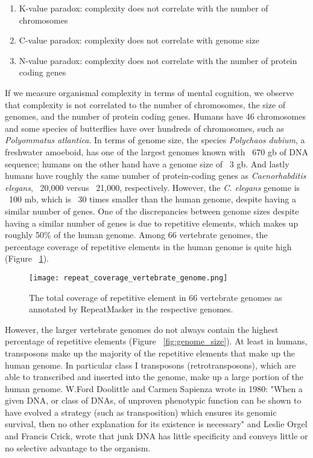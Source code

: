 \begin{enumerate}
   \item K-value paradox: complexity does not correlate with the number of chromosomes
   \item C-value paradox: complexity does not correlate with genome size
   \item N-value paradox: complexity does not correlate with the number of protein coding genes
\end{enumerate}

If we measure organismal complexity in terms of mental cognition, we observe that complexity is not correlated to the number of chromosomes, the size of genomes, and the number of protein coding genes. Humans have 46 chromosomes and some species of butterflies have over hundreds of chromosomes, such as \textit{Polyommatus atlantica}. In terms of genome size, the species \textit{Polychaos dubium}, a freshwater amoeboid, has one of the largest genomes known with ~670 gb of DNA sequence; humans on the other hand have a genome size of ~3 gb. And lastly humans have roughly the same number of protein-coding genes as \textit{Caenorhabditis elegans}, ~20,000 versus ~21,000, respectively. However, the \textit{C. elegans} genome is ~100 mb\cite{celegans1998sequencing}, which is ~30 times smaller than the human genome, despite having a similar number of genes. One of the discrepancies between genome sizes despite having a similar number of genes is due to repetitive elements, which makes up roughly 50\% of the human genome. Among 66 vertebrate genomes, the percentage coverage of repetitive elements in the human genome is quite high (Figure ~\ref{fig:repeat_coverage_vertebrate_genome}).

\begin{figure}[h]
   \centering
   \texttt{[image: repeat\_coverage\_vertebrate\_genome.png]}
   \caption[Coverage of repetitive elements in vertebrate genomes]{The total coverage of repetitive element in 66 vertebrate genomes as annotated by RepeatMasker in the respective genomes\cite{tang2014repcoverage}.}
   \label{fig:repeat_coverage_vertebrate_genome}
\end{figure}

However, the larger vertebrate genomes do not always contain the highest percentage of repetitive elements (Figure ~\ref{fig:genome_size}). At least in humans, transposons make up the majority of the repetitive elements that make up the human genome. In particular class I transposons (retrotransposons), which are able to transcribed and inserted into the genome, make up a large portion of the human genome. W.Ford Doolittle and Carmen Sapienza wrote in 1980\cite{doolittle1980selfish}: "When a given DNA, or class of DNAs, of unproven phenotypic function can be shown to have evolved a strategy (such as transposition) which ensures its genomic survival, then no other explanation for its existence is necessary" and Leslie Orgel and Francis Crick, wrote that junk DNA has little specificity and conveys little or no selective advantage to the organism\cite{orgel1980selfish}.

